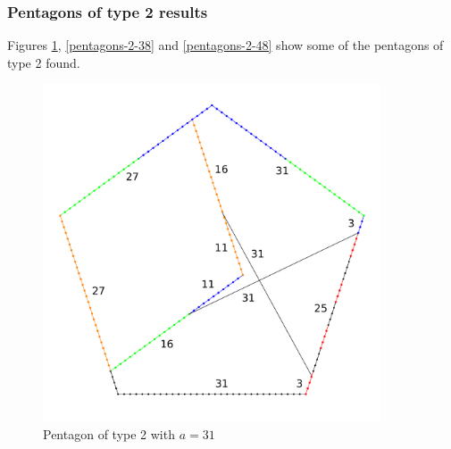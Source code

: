 \documentclass[11pt]{article}
\begin{document}
\subsubsection{Pentagons of type 2 results}

Figures \ref{pentagons-2-31}, \ref{pentagons-2-38} and \ref{pentagons-2-48} show some of the pentagons of type 2 found.

\begin{figure}
\centering
\includegraphics[width=10cm]{figs/pentagons-2-31}
\caption{Pentagon of type 2 with $a=31$}
\label{pentagons-2-31}
\end{figure}
\end{document}
